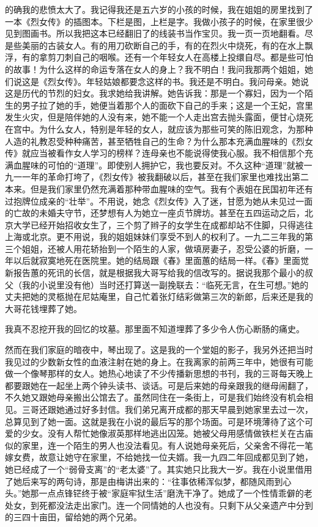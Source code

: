 \par 的确我的悲愤太大了。我记得我还是五六岁的小孩的时候，我在姐姐的房里找到了一本《烈女传》的插图本。下栏是图，上栏是字。我做小孩子的时候，在家里很少见到图画书。所以我把这本已经翻旧了的线装书当作宝贝。我一页一页地翻看。尽是些美丽的古装女人。有的用刀砍断自己的手，有的在烈火中烧死，有的在水上飘浮，有的拿剪刀刺自己的咽喉。还有一个年轻女人在高楼上投缳自尽。都是些可怕的故事！为什么这样的命运专落在女人的身上？我不明白！我问我那两个姐姐，她们说这是《烈女传》。年轻姑娘都要念这样的书。我还是不明白。我问母亲。她说这是历代的节烈的妇女。我求她给我讲解。她告诉我：那是一个寡妇，因为一个陌生的男子拉了她的手，她便当着那个人的面砍下自己的手来；这是一个王妃，宫里发生火灾，但是陪伴她的人没有来，她不能一个人走出宫去抛头露面，便甘心烧死在宫中。为什么女人，特别是年轻的女人，就应该为那些可笑的陈旧观念，为那种人造的礼教忍受种种痛苦，甚至牺牲自己的生命？为什么那本充满血腥味的《烈女传》就应当被看作女人学习的榜样？连母亲也不能说得使我心服。我不相信那个充满血腥味的可怕的“道理”。即使别人拥护它，我也要反对。不久这种“道理”就被一九一一年的革命打垮了，《烈女传》被我翻破以后，甚至在我们家里也难找出第二本来。但是我们家里仍然充满着那种带血腥味的空气。我有个表姐在民国初年还有过抱牌位成亲的“壮举”。不用说，她念《烈女传》入了迷，甘愿为她从未见过一面的亡故的未婚夫守节，还梦想有人为她立一座贞节牌坊。甚至在五四运动之后，北京大学已经开始招收女生了，三个剪了辫子的女学生在成都却站不住脚，只得逃往上海或北京。更不用说，我的姐姐妹妹们享受不到人的权利了。一九二三年我的第三个姐姐，还被人用花轿抬到一个陌生的人家，做填房妻子，忍受公婆的折磨，一年以后就寂寞地死在医院里。她的结局跟《春》里面蕙的结局一样。《春》里面觉新报告蕙的死讯的长信，就是根据我大哥写给我的信改写的。据说我那个最小的叔父（我的小说里没有他）当时还打算送一副挽联去：“临死无言，在生可想。”她的丈夫把她的灵柩抛在尼姑庵里，自己忙着张灯结彩做第三次的新郎，后来还是我的大哥花钱埋葬了她。
\par 我真不忍挖开我的回忆的坟墓。那里面不知道埋葬了多少令人伤心断肠的痛史。
\par 然而在我们家庭的暗夜中，琴出现了。这是我的一个堂姐的影子，我另外还把当时我见过的少数新女性的血液注射在她的身上。在我离家的前两三年中，她很有可能做一个像琴那样的女人。她热心地读了不少传播新思想的书刊，我的三哥每天晚上都要跟她在一起坐上两个钟头读书、谈话。可是后来她的母亲跟我的继母闹翻了，不久她又跟她母亲搬出公馆去了。虽然同住在一条街上，可是我们始终没有机会相见。三哥还跟她通过好多封信。我们弟兄离开成都的那天早晨到她家里去过一次，总算见到了她一面。这就是我在小说的最后写的那个场面。可是环境薄待了这个可爱的少女。没有人帮忙她像淑英那样地逃出囚笼。她被父母用感情做铁栏关在古庙似的家里，连一个陌生的男人也没法看见。有人说她母亲死后，父亲舍不得花一笔嫁女费，故意让她守在家里，不给她找一位夫婿。我一九四二年回成都见到了她，她已经成了一个“弱骨支离”的“老太婆”了。其实她只比我大一岁。我在小说里借用了她后来写的两句诗，那是由梅讲出来的：“往事依稀浑似梦，都随风雨到心头。”她那一点点锋铓终于被“家庭牢狱生活”磨洗干净了。她成了一个性情乖僻的老处女，到死都没法走出家门。连一个同情她的人也没有。只剩下从父亲遗产中分到的三四十亩田，留给她的两个兄弟。
